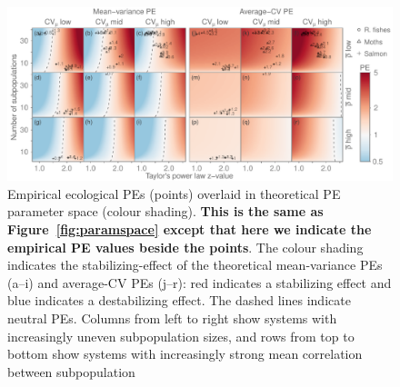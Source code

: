\begin{figure}[htbp]
  \centering
  \includegraphics[width=\textwidth]{prophets/PE-parameter-space-labels-20120614.pdf}
  \caption[Empirical ecological PEs overlaid in theoretical PE
    parameter space.]{Empirical ecological PEs (points) overlaid in theoretical PE
    parameter space (colour shading). \textbf{This is the same as
    Figure~\ref{fig:paramspace} except that here we indicate the empirical PE values
      beside the points}. The colour shading indicates the
    stabilizing-effect of the theoretical mean-variance PEs (a--i) and
    average-CV PEs (j--r): red indicates a stabilizing effect and blue indicates
    a destabilizing effect.
    The dashed lines indicate neutral PEs. Columns from left to right
    show systems with increasingly uneven subpopulation sizes,
    and rows from top to bottom show systems with increasingly strong mean
    correlation between subpopulation
}
\label{fig:paramspace-labels}
\end{figure}
\clearpage

